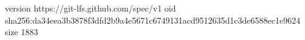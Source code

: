 version https://git-lfs.github.com/spec/v1
oid sha256:da34eea3b3878f3dfd2b9a4e5671c6749131acd9512635d1c3de6588ec1e9624
size 1883
